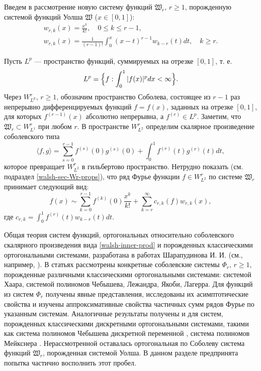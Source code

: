 Введем в рассмотрение новую систему функций $\mathfrak{W}_r$, $r \ge 1$, порожденную системой функций Уолша $\mathfrak{W}$ ($x \in [0,1]$):
\begin{gather}
\label{walsh-wrk-1}
w_{r,k}(x) = \frac{x^k}{k!}, \quad 0 \le k \le r-1,\\
\label{walsh-wrk-2}
w_{r,k}(x) = \frac{1}{(r-1)!}\int_{0}^{x}(x-t)^{r-1}w_{k-r}(t)dt, \quad k \ge r.
\end{gather}



Пусть $L^p$ --- пространство функций, суммируемых на отрезке $[0,1]$, т. е.
\begin{equation}
L^p=\Bigl\{
f: \int_{0}^{1}|f(x)|^pdx < \infty
\Bigr\}.
\end{equation}
Через $W_{L^p}^r$, $r \ge 1$, обозначим пространство Соболева, состоящее из $r-1$ раз непрерывно дифференцируемых функций $f=f(x)$, заданных на отрезке $[0,1]$, для которых $f^{(r-1)}(x)$ абсолютно непрерывна, а $f^{(r)}\in L^p$. Заметим, что $\mathfrak{W}_r \subset W_{L^1}^r$ при любом $r$. В пространстве $W_{L^2}^r$ определим скалярное произведение соболевского типа
\begin{equation}\label{walsh-inner-prod}
\langle f,g \rangle=\sum_{s=0}^{r-1}f^{(s)}(0)g^{(s)}(0)+\int_0^1 f^{(r)}(t)g^{(r)}(t)dt,
\end{equation}
которое превращает $W_{L^2}^r$ в гильбертово пространство.
Нетрудно показать (см. подраздел \ref{walsh-sec-Wr-props}), что ряд Фурье функции $f \in W_{L^2}^r$ по системе $\mathfrak{W}_r$ принимает следующий вид:
\begin{equation}\label{walsh-fourier-series-intro}
f(x) \sim \sum_{k=0}^{r-1}f^{(k)}(0)\frac{x^k}{k!}+
\sum_{k=r}^{\infty}c_{r,k}(f)w_{r,k}(x),
\end{equation}
где $c_{r,k}=\int_{0}^{1}f^{(r)}(t)w_{k-r}(t)dt$.

Общая теория систем функций, ортогональных относительно соболевского скалярного произведения вида \eqref{walsh-inner-prod} и порожденных классическими ортогональными системами, разработана в работах Шарапудинова И. И. (см., например, \cite{SharIzv2018}). В статьях \cite{SharIzv2018, Shar2017, SharSMJ2017, walsh-ShII-2015-demi} рассмотрены конкретные соболевские системы $\Phi_r$, $r \ge 1$, порожденные различными классическими ортогональными системами: системой Хаара, системой полиномов Чебышева, Лежандра, Якоби, Лагерра. Для функций из систем $\Phi_r$ получены явные представления, исследованы их асимптотические свойства и изучены аппроксимативные свойства частичных сумм рядов Фурье по указанным системам.
Аналогичные результаты получены и для систем, порожденных классическими дискретными ортогональными системами, такими как система полиномов Чебышева дискретной переменной \cite{SharIZVUZ}, система полиномов Мейкснера \cite{walsh-ShII-meix-2016, walsh-Gadzh-2016-saratov}. Нерассмотренной оставалась ортогональная по Соболеву система функций $\mathfrak{W}_r$, порожденная системой Уолша. В данном разделе предпринята попытка частично восполнить этот пробел.

